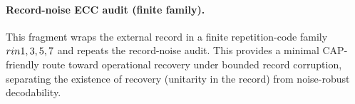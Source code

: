 \paragraph{Record-noise ECC audit (finite family).} \AuditTag This fragment wraps the external record in a finite repetition-code family $r\\in\\{1,3,5,7\\}$ and repeats the record-noise audit. This provides a minimal CAP-friendly route toward operational recovery under bounded record corruption, separating the existence of recovery (unitarity in the record) from noise-robust decodability.